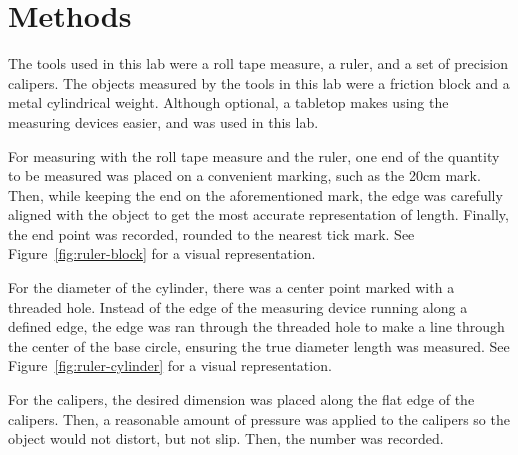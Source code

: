 \documentclass{article}
\begin{document}
\section{Methods}

The tools used in this lab were a roll tape measure, a ruler, and a set of precision calipers. The objects measured by the tools in this lab were a friction block and a metal cylindrical weight. Although optional, a tabletop makes using the measuring devices easier, and was used in this lab.

For measuring with the roll tape measure and the ruler, one end of the quantity to be measured was placed on a convenient marking, such as the 20cm mark. Then, while keeping the end on the aforementioned mark, the edge was carefully aligned with the object to get the most accurate representation of length. Finally, the end point was recorded, rounded to the nearest tick mark. See Figure~\ref{fig:ruler-block} for a visual representation.

For the diameter of the cylinder, there was a center point marked with a threaded hole. Instead of the edge of the measuring device running along a defined edge, the edge was ran through the threaded hole to make a line through the center of the base circle, ensuring the true diameter length was measured. See Figure~\ref{fig:ruler-cylinder} for a visual representation.

For the calipers, the desired dimension was placed along the flat edge of the calipers. Then, a reasonable amount of pressure was applied to the calipers so the object would not distort, but not slip. Then, the number was recorded.
\end{document}
